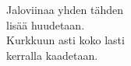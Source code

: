 
            Jaloviinaa yhden tähden \\
            lisää huudetaan. \\
            Kurkkuun asti koko lasti \\
            kerralla kaadetaan. \\
